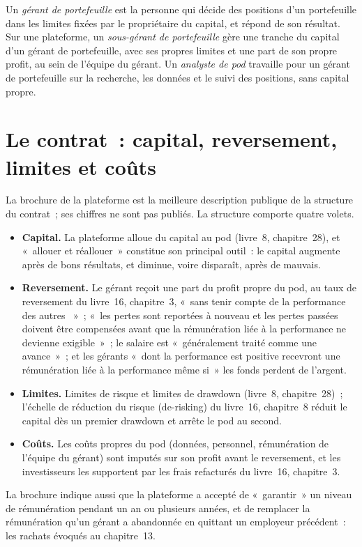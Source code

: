\begin{definition}\label{def:in:portfolio-manager-and-pod-analyst:roles}
Un \emph{gérant de portefeuille} est la personne qui décide des positions d'un portefeuille dans les
limites fixées par le propriétaire du capital, et répond de son résultat. Sur une plateforme, un \emph{sous-gérant de
portefeuille} gère une tranche du capital d'un gérant de portefeuille, avec ses propres limites et une part
de son propre profit, au sein de l'équipe du gérant. Un \emph{analyste de pod} travaille pour un gérant de portefeuille sur
la recherche, les données et le suivi des positions, sans capital propre.
\end{definition}

\section{Le contrat~: capital, reversement, limites et coûts}

La brochure de la plateforme est la meilleure description publique de la structure du contrat~; ses chiffres ne sont pas publiés. La
structure comporte quatre volets.
\begin{itemize}
\item \textbf{Capital.} La plateforme alloue du capital au pod (livre~8, chapitre~28), et «~allouer et
réallouer~» constitue son principal outil~: le capital augmente après de bons résultats, et diminue, voire disparaît, après de mauvais.
\item \textbf{Reversement.} Le gérant reçoit une part du profit propre du pod, au taux de reversement du livre~16, chapitre~3,
«~sans tenir compte de la performance des autres ~»~; «~les pertes sont reportées à nouveau et les pertes
passées doivent être compensées avant que la rémunération liée à la performance ne devienne exigible~»~; le salaire est «~généralement
traité comme une avance~»~; et les gérants «~dont la performance est positive recevront une rémunération liée à la performance même si~» les fonds perdent de l'argent.
\item \textbf{Limites.} Limites de risque et limites de drawdown (livre~8, chapitre~28)~; l'échelle de réduction du risque (de-risking) du livre~16, chapitre~8
réduit le capital dès un premier drawdown et arrête le pod au second.
\item \textbf{Coûts.} Les coûts propres du pod (données, personnel, rémunération de l'équipe du gérant) sont imputés sur son profit avant
le reversement, et les investisseurs les supportent par les frais refacturés du livre~16, chapitre~3.
\end{itemize}
La brochure indique aussi que la plateforme a accepté de «~garantir~» un niveau de rémunération pendant un an ou plusieurs années, et de
remplacer la rémunération qu'un gérant a abandonnée en quittant un employeur précédent~: les rachats évoqués au chapitre~13.

